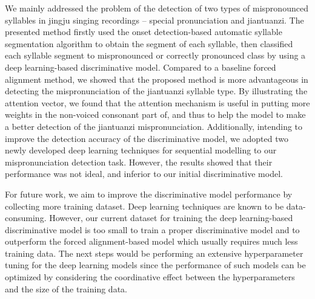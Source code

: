We mainly addressed the problem of the detection of two types of mispronounced syllables in jingju singing recordings -- special pronunciation and jiantuanzi. The presented method firstly used the onset detection-based automatic syllable segmentation algorithm to obtain the segment of each syllable, then classified each syllable segment to mispronounced or correctly pronounced class by using a deep learning-based discriminative model. Compared to a baseline forced alignment method, we showed that the proposed method is more advantageous in detecting the mispronunciation of the jiantuanzi syllable type. By illustrating the attention vector, we found that the attention mechanism is useful in putting more weights in the non-voiced consonant part of, and thus to help the model to make a better detection of the jiantuanzi mispronunciation. Additionally, intending to improve the detection accuracy of the discriminative model, we adopted two newly developed deep learning techniques for sequential modelling to our mispronunciation detection task. However, the results showed that their performance was not ideal, and inferior to our initial discriminative model.

For future work, we aim to improve the discriminative model performance by collecting more training dataset. Deep learning techniques are known to be data-consuming. However, our current dataset for training the deep learning-based discriminative model is too small to train a proper discriminative model and to outperform the forced alignment-based model which usually requires much less training data. The next steps would be performing an extensive hyperparameter tuning for the deep learning models since the performance of such models can be optimized by considering the coordinative effect between the hyperparameters and the size of the training data.
